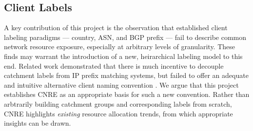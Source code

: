 \subsection{Client Labels}

A key contribution of this project is the observation that established client
labeling paradigms --- country, ASN, and BGP prefix --- fail to describe common
network resource exposure, especially at arbitrary levels of granularity. These
finds may warrant the introduction of a new, heirarchical labeling model to this
end. Related work demonstrated that there is much incentive to decouple
catchment labels from IP prefix matching systems, but failed to offer an
adequate and intuitive alternative client naming convention \cite{warrior2017drongo,benchaita2016stability}. We argue that this
project establishes CNRE as an appropriate basis for such a new convention.
Rather than arbtrarily building catchment groups and corresponding labels from
scratch, CNRE highlights \emph{existing} resource allocation trends, from which
appropriate insights can be drawn.
